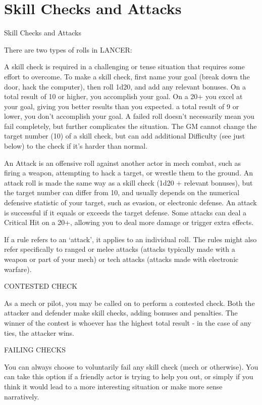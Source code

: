 \chapter{Skill Checks and Attacks}
   Skill Checks and Attacks

There are two types of rolls in LANCER:


A skill check is required in a challenging or tense situation that requires some effort to
overcome. To make a skill check, first name your goal (break down the door, hack the computer),
then roll 1d20, and add any relevant bonuses. On a total result of 10 or higher, you accomplish
your goal. On a 20+ you excel at your goal, giving you better results than you expected. a total
result of 9 or lower, you don’t accomplish your goal. A failed roll doesn’t necessarily mean you
fail completely, but further complicates the situation. The GM cannot change the target number
(10) of a skill check, but can add additional Difficulty (see just below) to the check if it’s harder
than normal.





An Attack is an offensive roll against another actor in mech combat, such as firing a weapon,
attempting to hack a target, or wrestle them to the ground. An attack roll is made the same way
as a skill check (1d20 + relevant bonuses), but the target number can differ from 10, and usually
depends on the numerical defensive statistic of your target, such as evasion, or electronic
defense. An attack is successful if it equals or exceeds the target defense. Some attacks can
deal a Critical Hit on a 20+, allowing you to deal more damage or trigger extra effects.


If a rule refers to an ‘attack’, it applies to an individual roll. The rules might also refer specifically
to ranged or melee attacks (attacks typically made with a weapon or part of your mech) or tech
attacks (attacks made with electronic warfare).


                                           CONTESTED CHECK

As a mech or pilot, you may be called on to perform a contested check. Both the attacker and
defender make skill checks, adding bonuses and penalties. The winner of the contest is whoever
has the highest total result - in the case of any ties, the attacker wins.


                                             FAILING CHECKS

You can always choose to voluntarily fail any skill check (mech or otherwise). You can take this
option if a friendly actor is trying to help you out, or simply if you think it would lead to a more
interesting situation or make more sense narratively.
